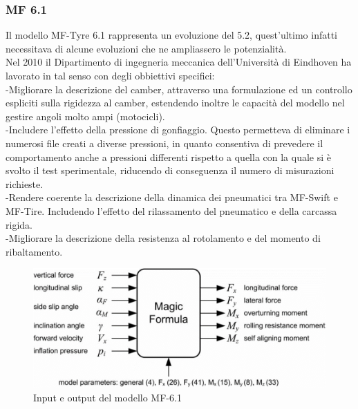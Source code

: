 \subsubsection{MF 6.1}
Il modello MF-Tyre 6.1 rappresenta un evoluzione del 5.2, quest'ultimo infatti necessitava di alcune evoluzioni che ne ampliassero le potenzialità.\\
Nel 2010 il Dipartimento di ingegneria meccanica dell'Università di Eindhoven ha lavorato in tal senso con degli obbiettivi specifici:\\
-Migliorare la descrizione del camber, attraverso una formulazione ed un controllo espliciti sulla rigidezza al camber, estendendo inoltre le capacità del modello nel gestire angoli molto ampi (motocicli).\\
-Includere l'effetto della pressione di gonfiaggio. Questo permetteva di eliminare i numerosi file creati a diverse pressioni, in quanto consentiva di prevedere il
comportamento anche a pressioni differenti rispetto a quella con la quale si è svolto il test sperimentale, riducendo di conseguenza il numero di misurazioni richieste.\\
-Rendere coerente la descrizione della dinamica dei pneumatici tra MF-Swift e MF-Tire. Includendo l'effetto del rilassamento del pneumatico e della carcassa rigida.\\
-Migliorare la descrizione della resistenza al rotolamento e del momento di ribaltamento.\\

\begin{figure}[ht]
    \centering
    \includegraphics[scale=0.6]{Immagini/Tyres/MF.png}
    \caption{Input e output del modello MF-6.1}
    \label{fig:MF_tyres}
\end{figure}

